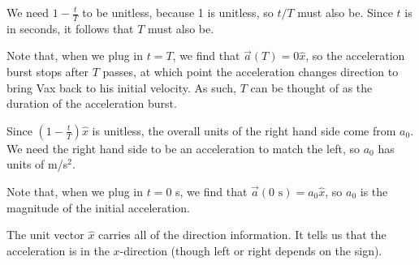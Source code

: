 \documentclass[]{article}
\begin{document}
\begin{TeacherMargin}
We need $1-\frac{t}{T}$ to be unitless, because 1 is unitless, so $t/T$ must also be. Since $t$ is in seconds, it follows that $T$ must also be.

Note that, when we plug in $t = T$, we find that $\vec{a}(T) = 0\hat{x}$, so the acceleration burst stops after $T$ passes, at which point the acceleration changes direction to bring Vax back to his initial velocity. As such, $T$ can be thought of as the duration of the acceleration burst.

Since $\left(1-\frac{t}{T}\right)\hat{x}$ is unitless, the overall units of the right hand side come from $a_{0}$. We need the right hand side to be an acceleration to match the left, so $a_{0}$ has units of m/s$^{2}$.

Note that, when we plug in $t=0$ s, we find that $\vec{a}(0\text{ s})=a_{0}\hat{x}$, so $a_{0}$ is the magnitude of the initial acceleration.

The unit vector $\hat{x}$ carries all of the direction information. It tells us that the acceleration is in the $x$-direction (though left or right depends on the sign).


\end{TeacherMargin}
\end{document}
